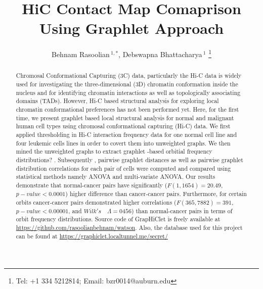 \documentclass[a4,center,fleqn]{NAR}
\begin{document}
\title{HiC Contact Map Comaprison Using Graphlet Approach}

\author{%
    Behnam Rasoolian\,$^{1,*}$,
    Debswapna Bhattacharya\,$^{1}$
    \footnote{
    Tel: +1 334 5212814; Email: bzr0014@auburn.edu}}

    \address{%
        $^{1}$ Auburn University
        }


            \maketitle

\begin{abstract}
    Chromosal Conformational Capturing (3C) data,
    particularly the Hi-C data is widely used for
    investigating the three-dimensional (3D) 
    chromatin conformation inside the nucleus and
    for identifying chromatin interactions as 
    well as topologically associating domains 
    (TADs). However, Hi-C based structural analysis
    for exploring local chromatin conformational 
    preferences has not been performed yet. 
    Here, for the first time, we present graphlet
    based local structural analysis for normal 
    and malignant human cell types  using chromosal
    conformational capturing (Hi-C) data. 
    We first applied thresholding in Hi-C interaction
    frequency data for one normal cell line and 
    four leukemic cells lines in order to covert 
    them into unweighted graphs. We then mined 
    the unweighted graphs to extract graphlet -based 
    orbitial frequency distributions? . Subsequently
    , pairwise graphlet distances as well as 
    pairwise graphlet distribution correlations 
    for each pair of cells were computed and 
    compared using statistical methods namely 
    ANOVA and multi-variate ANOVA. Our results 
    demonstrate that normal-cancer pairs have 
    significantly ($F(1, 1654) = 20.49$, $p-value
    < 0.0001$) higher difference than cancer-cancer 
    pairs. Furthermore, for certain orbits cancer-cancer 
    pairs demonstrated higher correlations 
    ($F(365, 7882)=391$, $p-value<0.00001$, and 
    $Wilk's \quad \Lambda=0456$) than normal-cancer pairs 
    in terms of orbit frequency distributions. 
    Source code of GrapHiClet 
    is freely available at 
    \url{https://github.com/rasoolianbehnam/watson}.
    Also, the database used for this project can be
    found at \url{https://graphiclet.localtunnel.me/secret/}
\end{abstract}
\end{document}
